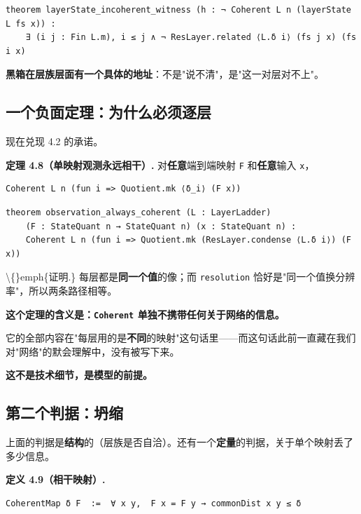 \documentclass[11pt,a4paper]{ctexart}
\begin{document}
\begin{lstlisting}
theorem layerState_incoherent_witness (h : ¬ Coherent L n (layerState L fs x)) :
    ∃ (i j : Fin L.m), i ≤ j ∧ ¬ ResLayer.related ⟨L.δ i⟩ (fs j x) (fs i x)
\end{lstlisting}

\textbf{黑箱在层族层面有一个具体的地址}：不是"说不清"，是"这一对层对不上"。

\subsection{一个负面定理：为什么必须逐层}

现在兑现 4.2 的承诺。

\textbf{定理 4.8（单映射观测永远相干）.} 对\textbf{任意}端到端映射 \texttt{F} 和\textbf{任意}输入 \texttt{x}，

\begin{lstlisting}
Coherent L n (fun i => Quotient.mk ⟨δ_i⟩ (F x))
\end{lstlisting}

\begin{lstlisting}
theorem observation_always_coherent (L : LayerLadder)
    (F : StateQuant n → StateQuant n) (x : StateQuant n) :
    Coherent L n (fun i => Quotient.mk (ResLayer.condense ⟨L.δ i⟩) (F x))
\end{lstlisting}

\textbackslash\{\}emph\{证明.\} 每层都是\textbf{同一个值}的像；而 \texttt{resolution} 恰好是"同一个值换分辨率"，所以两条路径相等。

\textbf{这个定理的含义是：\texttt{Coherent} 单独不携带任何关于网络的信息。}

它的全部内容在"每层用的是\textbf{不同}的映射"这句话里——而这句话此前一直藏在我们对"网络"的默会理解中，没有被写下来。

\textbf{这不是技术细节，是模型的前提。}

\subsection{第二个判据：坍缩}

上面的判据是\textbf{结构}的（层族是否自洽）。还有一个\textbf{定量}的判据，关于单个映射丢了多少信息。

\textbf{定义 4.9（相干映射）.}

\begin{lstlisting}
CoherentMap δ F  :=  ∀ x y,  F x = F y → commonDist x y ≤ δ
\end{lstlisting}
\end{document}

